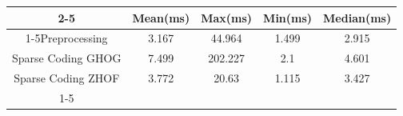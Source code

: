 \documentclass{standalone}
\begin{document}
 
 \begin{tabular}{|c |c |c |c |c |}
\cline{2-5}\cline{2-5} \multicolumn{1}{c |}{ } & Mean(ms) & Max(ms) & Min(ms) & Median(ms)\\ 
\cline{1-5}Preprocessing & 3.167 & 44.964 & 1.499 & 2.915\\ 
 \hhline{|=|=|=|=|=|}Sparse Coding GHOG & 7.499 & 202.227 & 2.1 & 4.601\\ 
 \hhline{|=|=|=|=|=|}Sparse Coding ZHOF & 3.772 & 20.63 & 1.115 & 3.427\\ 
 \cline{1-5}\hline \end{tabular}
 
\end{document}
